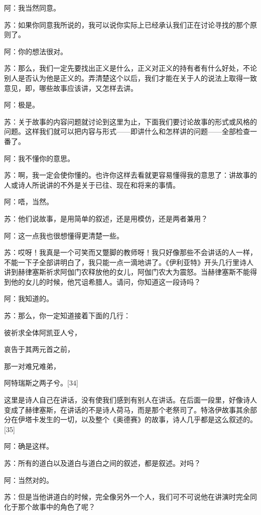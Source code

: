 \documentclass[12pt,oneside]{book}
\begin{document}
阿：我当然同意。

苏：如果你同意我所说的，我可以说你实际上已经承认我们正在讨论寻找的那个原则了。

阿：你的想法很对。

苏：那么，我们一定先要找出正义是什么，正义对正义的持有者有什么好处，不论别人是否认为他是正义的。弄清楚这个以后，我们才能在关于人的说法上取得一致意见，即，哪些故事应该讲，又怎样去讲。

阿：极是。

苏：关于故事的内容问题就讨论到这里为止，下面我们要讨论故事的形式或风格的问题。这样我们就可以把内容与形式——即讲什么和怎样讲的问题——全部检查一番了。

阿：我不懂你的意思。

苏：啊，我一定会使你懂的。也许你这样去看就更容易懂得我的意思了：讲故事的人或诗人所说讲的不外是关于已往、现在和将来的事情。

阿：唔，当然。

苏：他们说故事，是用简单的叙述，还是用模仿，还是两者兼用？

阿：这一点我也很想懂得更清楚一些。

苏：哎呀！我真是一个可笑而又蹩脚的教师呀！我只好像那些不会讲话的人一样，不能一下子全部讲明白了，我只能一点一滴地讲了。《伊利亚特》开头几行里诗人讲到赫律塞斯祈求阿伽门农释放他的女儿，阿伽门农大为震怒。当赫律塞斯不能得到他的女儿的时候，他咒诅希腊人。请问，你知道这一段诗吗？

阿：我知道的。

苏：那么，你一定知道接着下面的几行：





彼祈求全体阿凯亚人兮，

哀告于其两元首之前，

那一对难兄难弟，

阿特瑞斯之两子兮。[34]





这里是诗人自己在讲话，没有使我们感到有别人在讲话。在后面一段里，好像诗人变成了赫律塞斯，在讲话的不是诗人荷马，而是那个老祭司了。特洛伊故事其余部分在伊塔卡发生的一切，以及整个《奥德赛》的故事，诗人几乎都是这么叙述的。[35]

阿：确是这样。

苏：所有的道白以及道白与道白之间的叙述，都是叙述。对吗？

阿：当然对的。

苏：但是当他讲道白的时候，完全像另外一个人，我们可不可说他在讲演时完全同化于那个故事中的角色了呢？
\end{document}
